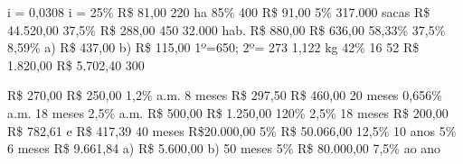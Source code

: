 \begin{respostas}{6}
    \ansitem{} i = 0,0308
    \ansitem{} i = 25\%
    \ansitem{} R\$ 81,00
    \ansitem{} 220 ha
    \ansitem{} 85\%
    \ansitem{} 400
    \ansitem{} R\$ 91,00
    \ansitem{} 5\%
    \ansitem{} 317.000 sacas
    \ansitem{} R\$ 44.520,00
    \ansitem{} 37,5\%
    \ansitem{} R\$ 288,00
    \ansitem{} 450
    \ansitem{} 32.000 hab.
    \ansitem{} R\$ 880,00
    \ansitem{} R\$ 636,00
    \ansitem{} 58,33\%
    \ansitem{} 37,5\%
    \ansitem{} 8,59\%
	\ansitem{} a) R\$ 437,00	
  	\ansitem{} b) R\$ 115,00
	\ansitem{} 1º=650; 2º= 273
    \ansitem{} 1,122 kg
	\ansitem{} 42\%
	\ansitem{} 16
	\ansitem{} 52
	\ansitem{} R\$ 1.820,00
	\ansitem{} R\$ 5.702,40
	\ansitem{} 300
\end{respostas}

\begin{respostas}{7}
    \ansitem{} R\$ 270,00
    \ansitem{} R\$ 250,00
    \ansitem{} 1,2\% a.m.
    \ansitem{} 8 meses
    \ansitem{} R\$ 297,50
    \ansitem{} R\$ 460,00
    \ansitem{} 20 meses
    \ansitem{} 0,656\% a.m.
    \ansitem{} 18 meses
    \ansitem{} 2,5\% a.m. 
    \ansitem{} R\$ 500,00
    \ansitem{} R\$ 1.250,00
    \ansitem{} 120\%
    \ansitem{} 2,5\%
    \ansitem{} 18 meses
    \ansitem{} R\$ 200,00
    \ansitem{} R\$ 782,61 e R\$ 417,39
    \ansitem{} 40 meses
    \ansitem{} R\$20.000,00 
    \ansitem{} 5\%
    \ansitem{} R\$ 50.066,00
    \ansitem{} 12,5\%
    \ansitem{} 10 anos
    \ansitem{} 5\%
    \ansitem{} 6 meses
    \ansitem{} R\$ 9.661,84
    \ansitem{} a) R\$ 5.600,00 \quad \quad b) 50 meses
	\ansitem{} 5\%
	\ansitem{} R\$ 80.000,00
	\ansitem{} 7,5\% ao ano
\end{respostas}